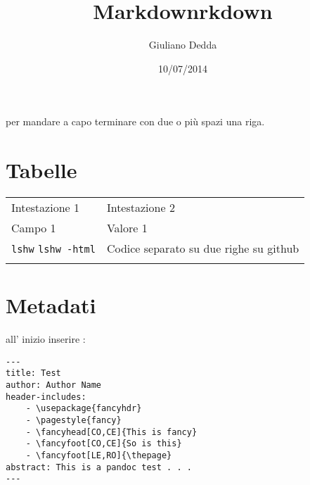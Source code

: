 \documentclass[]{article}
\title{Markdownrkdown}
\author{Giuliano Dedda}
\date{10/07/2014}
\begin{document}
\maketitle

per mandare a capo terminare con due o più spazi una riga.

\section{Tabelle}\label{tabelle}

\begin{longtable}[l]{@{}ll@{}}
\toprule\addlinespace
Intestazione 1 & Intestazione 2
\\\addlinespace
\midrule\endhead
Campo 1 & Valore 1
\\\addlinespace
\texttt{lshw} \texttt{lshw -html} & Codice separato su due righe su
github
\\\addlinespace
\bottomrule
\end{longtable}

\section{Metadati}\label{metadati}

all' inizio inserire :

\begin{verbatim}
---
title: Test
author: Author Name
header-includes:
    - \usepackage{fancyhdr}
    - \pagestyle{fancy}
    - \fancyhead[CO,CE]{This is fancy}
    - \fancyfoot[CO,CE]{So is this}
    - \fancyfoot[LE,RO]{\thepage}
abstract: This is a pandoc test . . . 
---
\end{verbatim}
\end{document}
